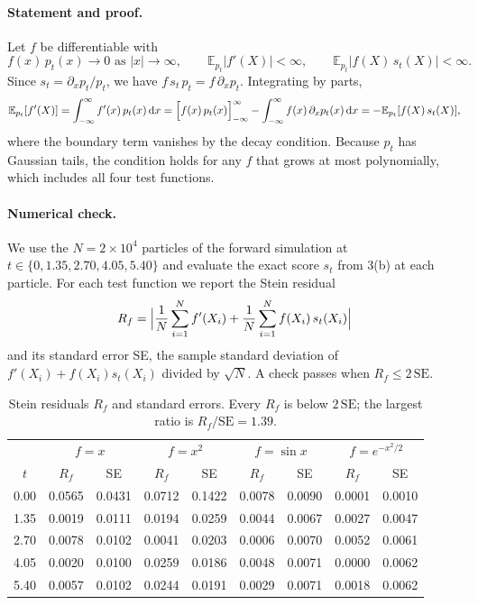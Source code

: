 \documentclass[11pt]{article}
\newcommand{\E}{\mathbb{E}}
\newcommand{\dd}{\mathrm{d}}
\begin{document}
\paragraph{Statement and proof.} Let $f$ be differentiable with
\[
f(x)\,p_t(x)\to0 \text{ as } |x|\to\infty, \qquad \E_{p_t}|f'(X)|<\infty, \qquad \E_{p_t}|f(X)\,s_t(X)|<\infty .
\]
Since $s_t = \partial_x p_t/p_t$, we have $f\,s_t\,p_t = f\,\partial_x p_t$. Integrating by parts,
\[
\E_{p_t}[f'(X)] = \int_{-\infty}^{\infty} f'(x)\,p_t(x)\,\dd x
= \Bigl[f(x)\,p_t(x)\Bigr]_{-\infty}^{\infty} - \int_{-\infty}^{\infty} f(x)\,\partial_x p_t(x)\,\dd x
= -\E_{p_t}[f(X)\,s_t(X)] ,
\]
where the boundary term vanishes by the decay condition. Because $p_t$ has Gaussian tails, the condition holds for
any $f$ that grows at most polynomially, which includes all four test functions.

\paragraph{Numerical check.} We use the $N=2\times10^4$ particles of the forward simulation at
$t\in\{0, 1.35, 2.70, 4.05, 5.40\}$ and evaluate the exact score $s_t$ from 3(b) at each particle. For each test function we
report the Stein residual
\[
R_f = \Bigl|\frac1N\sum_{i=1}^N f'(X_i) + \frac1N\sum_{i=1}^N f(X_i)\,s_t(X_i)\Bigr|
\]
and its standard error SE, the sample standard deviation of $f'(X_i) + f(X_i)s_t(X_i)$ divided by $\sqrt N$.
A check passes when $R_f \le 2\,\mathrm{SE}$.

\begin{table}[H]
\centering
\small
\begin{tabular}{c|cc|cc|cc|cc}
\hline
& \multicolumn{2}{c|}{$f=x$} & \multicolumn{2}{c|}{$f=x^2$} & \multicolumn{2}{c|}{$f=\sin x$} & \multicolumn{2}{c}{$f=e^{-x^2/2}$} \\
$t$ & $R_f$ & SE & $R_f$ & SE & $R_f$ & SE & $R_f$ & SE \\
\hline
0.00 & 0.0565 & 0.0431 & 0.0712 & 0.1422 & 0.0078 & 0.0090 & 0.0001 & 0.0010 \\
1.35 & 0.0019 & 0.0111 & 0.0194 & 0.0259 & 0.0044 & 0.0067 & 0.0027 & 0.0047 \\
2.70 & 0.0078 & 0.0102 & 0.0041 & 0.0203 & 0.0006 & 0.0070 & 0.0052 & 0.0061 \\
4.05 & 0.0020 & 0.0100 & 0.0259 & 0.0186 & 0.0048 & 0.0071 & 0.0000 & 0.0062 \\
5.40 & 0.0057 & 0.0102 & 0.0244 & 0.0191 & 0.0029 & 0.0071 & 0.0018 & 0.0062 \\
\hline
\end{tabular}
\caption{Stein residuals $R_f$ and standard errors. Every $R_f$ is below $2\,\mathrm{SE}$; the largest ratio is $R_f/\mathrm{SE} = 1.39$.}
\label{tab:stein}
\end{table}
\end{document}
